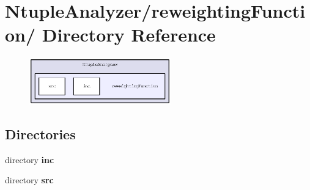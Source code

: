 \section{Ntuple\-Analyzer/reweighting\-Function/ Directory Reference}
\label{dir_f30975aa6991ff65196e7a9d45e5bcbd}


\begin{figure}[H]
\begin{center}
\leavevmode
\includegraphics[width=173pt]{dir_f30975aa6991ff65196e7a9d45e5bcbd_dep}
\end{center}
\end{figure}
\subsection*{Directories}
\begin{CompactItemize}
\item 
directory \bf{inc}
\item 
directory \bf{src}
\end{CompactItemize}

